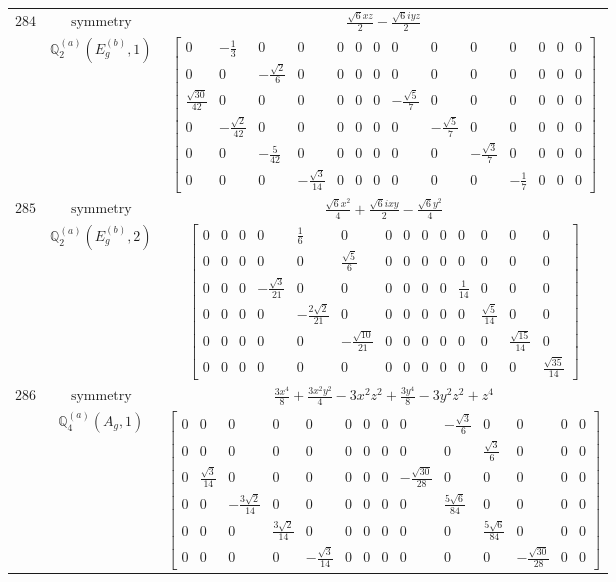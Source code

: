 \documentclass[fleqn,8pt,landscape]{jsarticle}
\begin{document}
\begin{longtable}{ccc}
$ 284 $ & $ \text{symmetry} $ & $ \frac{\sqrt{6} x z}{2} - \frac{\sqrt{6} i y z}{2} $ \\
$  $ & $ \mathbb{Q}_{2}^{(a)}(E_{g}^{(b)},1) $ & $ \begin{bmatrix} 0 & - \frac{1}{3} & 0 & 0 & 0 & 0 & 0 & 0 & 0 & 0 & 0 & 0 & 0 & 0 \\ 0 & 0 & - \frac{\sqrt{2}}{6} & 0 & 0 & 0 & 0 & 0 & 0 & 0 & 0 & 0 & 0 & 0 \\ \frac{\sqrt{30}}{42} & 0 & 0 & 0 & 0 & 0 & 0 & - \frac{\sqrt{5}}{7} & 0 & 0 & 0 & 0 & 0 & 0 \\ 0 & - \frac{\sqrt{2}}{42} & 0 & 0 & 0 & 0 & 0 & 0 & - \frac{\sqrt{5}}{7} & 0 & 0 & 0 & 0 & 0 \\ 0 & 0 & - \frac{5}{42} & 0 & 0 & 0 & 0 & 0 & 0 & - \frac{\sqrt{3}}{7} & 0 & 0 & 0 & 0 \\ 0 & 0 & 0 & - \frac{\sqrt{3}}{14} & 0 & 0 & 0 & 0 & 0 & 0 & - \frac{1}{7} & 0 & 0 & 0 \end{bmatrix} $ \\ \hline
$ 285 $ & $ \text{symmetry} $ & $ \frac{\sqrt{6} x^{2}}{4} + \frac{\sqrt{6} i x y}{2} - \frac{\sqrt{6} y^{2}}{4} $ \\
$  $ & $ \mathbb{Q}_{2}^{(a)}(E_{g}^{(b)},2) $ & $ \begin{bmatrix} 0 & 0 & 0 & 0 & \frac{1}{6} & 0 & 0 & 0 & 0 & 0 & 0 & 0 & 0 & 0 \\ 0 & 0 & 0 & 0 & 0 & \frac{\sqrt{5}}{6} & 0 & 0 & 0 & 0 & 0 & 0 & 0 & 0 \\ 0 & 0 & 0 & - \frac{\sqrt{3}}{21} & 0 & 0 & 0 & 0 & 0 & 0 & \frac{1}{14} & 0 & 0 & 0 \\ 0 & 0 & 0 & 0 & - \frac{2 \sqrt{2}}{21} & 0 & 0 & 0 & 0 & 0 & 0 & \frac{\sqrt{5}}{14} & 0 & 0 \\ 0 & 0 & 0 & 0 & 0 & - \frac{\sqrt{10}}{21} & 0 & 0 & 0 & 0 & 0 & 0 & \frac{\sqrt{15}}{14} & 0 \\ 0 & 0 & 0 & 0 & 0 & 0 & 0 & 0 & 0 & 0 & 0 & 0 & 0 & \frac{\sqrt{35}}{14} \end{bmatrix} $ \\ \hline
$ 286 $ & $ \text{symmetry} $ & $ \frac{3 x^{4}}{8} + \frac{3 x^{2} y^{2}}{4} - 3 x^{2} z^{2} + \frac{3 y^{4}}{8} - 3 y^{2} z^{2} + z^{4} $ \\
$  $ & $ \mathbb{Q}_{4}^{(a)}(A_{g},1) $ & $ \begin{bmatrix} 0 & 0 & 0 & 0 & 0 & 0 & 0 & 0 & 0 & - \frac{\sqrt{3}}{6} & 0 & 0 & 0 & 0 \\ 0 & 0 & 0 & 0 & 0 & 0 & 0 & 0 & 0 & 0 & \frac{\sqrt{3}}{6} & 0 & 0 & 0 \\ 0 & \frac{\sqrt{3}}{14} & 0 & 0 & 0 & 0 & 0 & 0 & - \frac{\sqrt{30}}{28} & 0 & 0 & 0 & 0 & 0 \\ 0 & 0 & - \frac{3 \sqrt{2}}{14} & 0 & 0 & 0 & 0 & 0 & 0 & \frac{5 \sqrt{6}}{84} & 0 & 0 & 0 & 0 \\ 0 & 0 & 0 & \frac{3 \sqrt{2}}{14} & 0 & 0 & 0 & 0 & 0 & 0 & \frac{5 \sqrt{6}}{84} & 0 & 0 & 0 \\ 0 & 0 & 0 & 0 & - \frac{\sqrt{3}}{14} & 0 & 0 & 0 & 0 & 0 & 0 & - \frac{\sqrt{30}}{28} & 0 & 0 \end{bmatrix} $ \\ \hline

\end{longtable}
\end{document}
